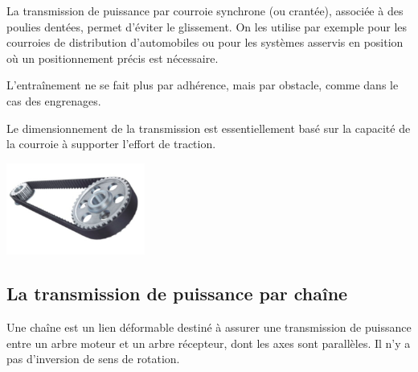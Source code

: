 \documentclass[11pt,oneside]{article}
\begin{document}
\begin{minipage}[c]{.6\linewidth}
La transmission de puissance par courroie synchrone (ou crantée), associée à des poulies dentées, permet d’éviter le glissement. On les utilise par exemple pour les courroies de distribution d’automobiles ou pour les systèmes asservis en position où un positionnement précis est nécessaire.

L’entraînement ne se fait plus par adhérence, mais par obstacle, comme dans le cas des engrenages.

Le dimensionnement de la transmission est essentiellement basé sur la capacité de la courroie à supporter l’effort de traction.

\end{minipage} \hfill
\begin{minipage}[c]{.35\linewidth}
\begin{center}
\includegraphics[height=3cm]{png/fig_48}
\end{center}
\end{minipage} 

\subsection{La transmission de puissance par chaîne}

Une chaîne est un lien déformable destiné à assurer une transmission de puissance entre un arbre moteur et un arbre récepteur, dont les axes sont parallèles. Il n’y a pas d’inversion de sens de rotation.
\end{document}
